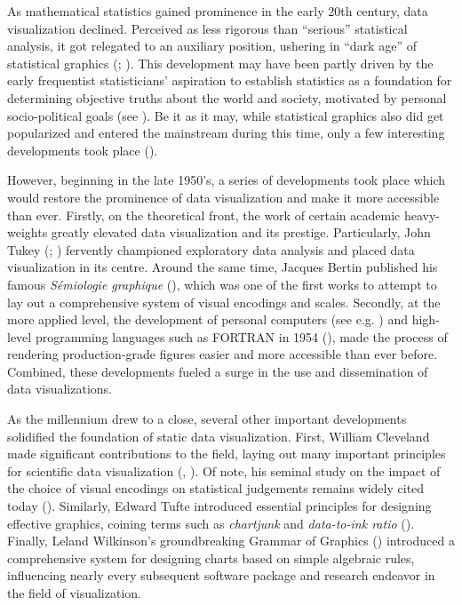 \documentclass[
]{book}
\begin{document}
As mathematical statistics gained prominence in the early 20th century, data visualization declined. Perceived as less rigorous than ``serious'' statistical analysis, it got relegated to an auxiliary position, ushering in ``dark age'' of statistical graphics (; ). This development may have been partly driven by the early frequentist statisticians' aspiration to establish statistics as a foundation for determining objective truths about the world and society, motivated by personal socio-political goals (see ). Be it as it may, while statistical graphics also did get popularized and entered the mainstream during this time, only a few interesting developments took place ().

However, beginning in the late 1950's, a series of developments took place which would restore the prominence of data visualization and make it more accessible than ever. Firstly, on the theoretical front, the work of certain academic heavy-weights greatly elevated data visualization and its prestige. Particularly, John Tukey (; ) fervently championed exploratory data analysis and placed data visualization in its centre. Around the same time, Jacques Bertin published his famous \emph{Sémiologie graphique} (), which was one of the first works to attempt to lay out a comprehensive system of visual encodings and scales. Secondly, at the more applied level, the development of personal computers (see e.g. ) and high-level programming languages such as FORTRAN in 1954 (), made the process of rendering production-grade figures easier and more accessible than ever before. Combined, these developments fueled a surge in the use and dissemination of data visualizations.

As the millennium drew to a close, several other important developments solidified the foundation of static data visualization. First, William Cleveland made significant contributions to the field, laying out many important principles for scientific data visualization (, ). Of note, his seminal study on the impact of the choice of visual encodings on statistical judgements remains widely cited today (). Similarly, Edward Tufte introduced essential principles for designing effective graphics, coining terms such as \emph{chartjunk} and \emph{data-to-ink ratio} (). Finally, Leland Wilkinson's groundbreaking Grammar of Graphics () introduced a comprehensive system for designing charts based on simple algebraic rules, influencing nearly every subsequent software package and research endeavor in the field of visualization.
\end{document}
